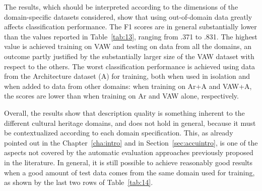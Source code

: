 \documentclass[epsfig,a4paper,12pt,titlepage]{book}
\begin{document}
The results, which should be interpreted according to the dimensions of the domain-specific  datasets considered, show that using out-of-domain data greatly affects classification performance. The F1 scores are in general substantially lower than the values reported in Table~\ref{tab:13}, ranging from .371 to .831. The highest value is achieved training on VAW and testing on data from all the domains, an outcome partly justified by the substantially larger size of the VAW dataset with respect to the others. The worst classification performance is achieved using data from the Architecture dataset (A) for training, both when  used in isolation and when added to data from other domains: when training on Ar+A and VAW+A, the scores are lower than when training on Ar and VAW alone, respectively.

Overall, the results show that description quality is something inherent to the different cultural heritage domains, and does not hold in general, because it must be contextualized according to each domain specification. This, as already pointed out in the Chapter~\ref{cha:intro} and in Section~\ref{sec:accuintro}, is one of the aspects not covered by the automatic evaluation approaches previously proposed in the literature. In general, it is still possible to achieve reasonably good results when a good amount of test data comes from the same domain used for training, as shown by the last two rows of Table~\ref{tab:14}.
\end{document}
